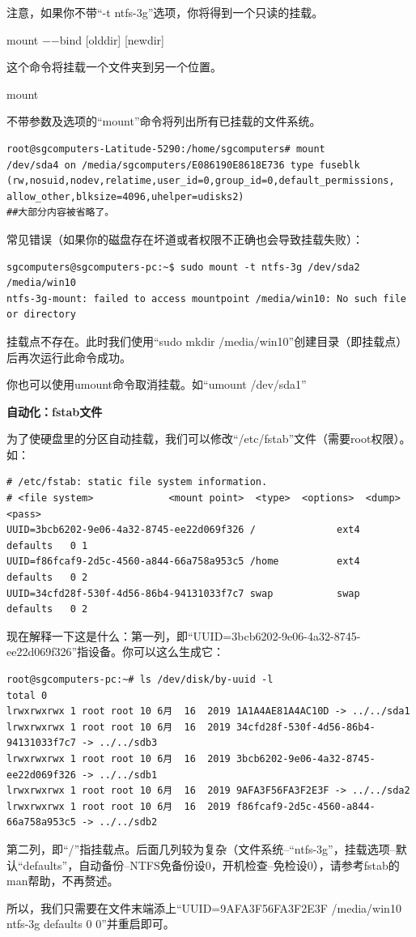 \documentclass{book}
\begin{document}
注意，如果你不带“-t ntfs-3g”选项，你将得到一个只读的挂载。\par
mount −−bind [olddir] [newdir]\par
这个命令将挂载一个文件夹到另一个位置。\par
mount\par
不带参数及选项的“mount”命令将列出所有已挂载的文件系统。\par
\begin{verbatim}
root@sgcomputers-Latitude-5290:/home/sgcomputers# mount
/dev/sda4 on /media/sgcomputers/E086190E8618E736 type fuseblk
(rw,nosuid,nodev,relatime,user_id=0,group_id=0,default_permissions,
allow_other,blksize=4096,uhelper=udisks2)
##大部分内容被省略了。
\end{verbatim}
常见错误（如果你的磁盘存在坏道或者权限不正确也会导致挂载失败）：
\begin{verbatim}
sgcomputers@sgcomputers-pc:~$ sudo mount -t ntfs-3g /dev/sda2 /media/win10
ntfs-3g-mount: failed to access mountpoint /media/win10: No such file or directory
\end{verbatim}
挂载点不存在。此时我们使用“sudo mkdir /media/win10”创建目录（即挂载点）后再次运行此命令成功。\par
你也可以使用umount命令取消挂载。如“umount /dev/sda1”\par
\Large \textbf{自动化：fstab文件} \normalsize \par
为了使硬盘里的分区自动挂载，我们可以修改“/etc/fstab”文件（需要root权限）。如：
\begin{verbatim}
# /etc/fstab: static file system information.
# <file system>             <mount point>  <type>  <options>  <dump>  <pass>
UUID=3bcb6202-9e06-4a32-8745-ee22d069f326 /              ext4    defaults   0 1
UUID=f86fcaf9-2d5c-4560-a844-66a758a953c5 /home          ext4    defaults   0 2
UUID=34cfd28f-530f-4d56-86b4-94131033f7c7 swap           swap    defaults   0 2
\end{verbatim}
现在解释一下这是什么：第一列，即“UUID=3bcb6202-9e06-4a32-8745-ee22d069f326”指设备。你可以这么生成它：
\begin{verbatim}
root@sgcomputers-pc:~# ls /dev/disk/by-uuid -l
total 0
lrwxrwxrwx 1 root root 10 6月  16  2019 1A1A4AE81A4AC10D -> ../../sda1
lrwxrwxrwx 1 root root 10 6月  16  2019 34cfd28f-530f-4d56-86b4-94131033f7c7 -> ../../sdb3
lrwxrwxrwx 1 root root 10 6月  16  2019 3bcb6202-9e06-4a32-8745-ee22d069f326 -> ../../sdb1
lrwxrwxrwx 1 root root 10 6月  16  2019 9AFA3F56FA3F2E3F -> ../../sda2
lrwxrwxrwx 1 root root 10 6月  16  2019 f86fcaf9-2d5c-4560-a844-66a758a953c5 -> ../../sdb2
\end{verbatim}
第二列，即“/”指挂载点。后面几列较为复杂（文件系统--“ntfs-3g”，挂载选项--默认“defaults”，自动备份--NTFS免备份设0，开机检查--免检设0），请参考fstab的man帮助，不再赘述。\par
所以，我们只需要在文件末端添上“UUID=9AFA3F56FA3F2E3F  /media/win10 ntfs-3g defaults   0 0”并重启即可。
\end{document}
